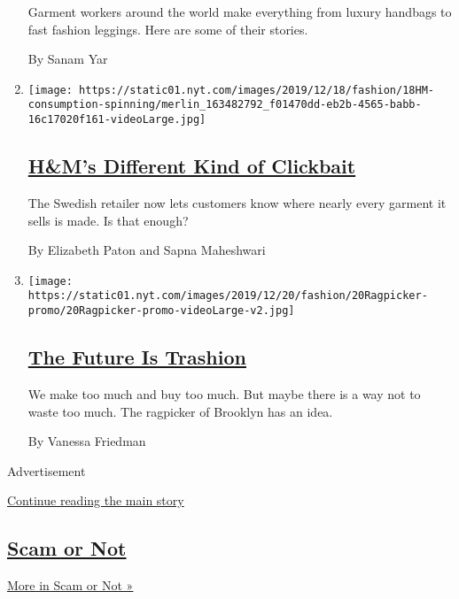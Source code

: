 \begin{enumerate}
  Garment workers around the world make everything from luxury handbags
  to fast fashion leggings. Here are some of their stories.

  By Sanam Yar
\item
  \texttt{[image: https://static01.nyt.com/images/2019/12/18/fashion/18HM-consumption-spinning/merlin\_163482792\_f01470dd-eb2b-4565-babb-16c17020f161-videoLarge.jpg]}

  \hypertarget{hms-different-kind-of-clickbait}{%
  \subsection{\texorpdfstring{\href{/2019/12/18/fashion/hms-supply-chain-transparency.html}{H\&M's
  Different Kind of
  Clickbait}}{H\&M's Different Kind of Clickbait}}\label{hms-different-kind-of-clickbait}}

  The Swedish retailer now lets customers know where nearly every
  garment it sells is made. Is that enough?

  By Elizabeth Paton and Sapna Maheshwari
\item
  \texttt{[image: https://static01.nyt.com/images/2019/12/20/fashion/20Ragpicker-promo/20Ragpicker-promo-videoLarge-v2.jpg]}

  \hypertarget{the-future-is-trashion}{%
  \subsection{\texorpdfstring{\href{/2019/12/20/style/zero-waste-daniel-trashion.html}{The
  Future Is
  Trashion}}{The Future Is Trashion}}\label{the-future-is-trashion}}

  We make too much and buy too much. But maybe there is a way not to
  waste too much. The ragpicker of Brooklyn has an idea.

  By Vanessa Friedman
\end{enumerate}

Advertisement

\protect\hyperlink{after-mid3}{Continue reading the main story}

\hypertarget{scam-or-not}{%
\subsection{\texorpdfstring{\href{/column/scam-or-not}{Scam or
Not}}{Scam or Not}}\label{scam-or-not}}

\href{/column/scam-or-not}{More in Scam or Not »}

